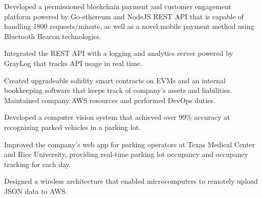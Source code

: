 \documentclass[]{deedy-resume-openfont}
\begin{document}
\begin{minipage}[t]{0.73\textwidth}
\begin{tightemize}
\item Developed a permissioned blockchain payment and customer engagement platform powered by Go-ethereum and NodeJS REST API that is capable of handling 1800 requests/minute, as well as a novel mobile payment method using Bluetooth Beacon technologies.
\item Integrated the REST API with a logging and analytics server powered by GrayLog that tracks API usage in real time.
\item Created upgradeable solidity smart contracts on EVMs and an internal bookkeeping software that keeps track of company’s assets and liabilities. Maintained company AWS resources and performed DevOps duties.%
\end{tightemize}
\sectionsep

\href{https://parkit.io}{}
\begin{tightemize}
\item Developed a computer vision system that achieved over 99\% accuracy at recognizing parked vehicles in a parking lot.
\item Improved the company's web app for parking operators at Texas Medical Center and Rice University, providing real-time parking lot occupancy and occupancy tracking for each day.
\item Designed a wireless architecture that enabled microcomputers to remotely upload JSON data to AWS.
\end{tightemize}
\sectionsep



\end{minipage}
\end{document}
